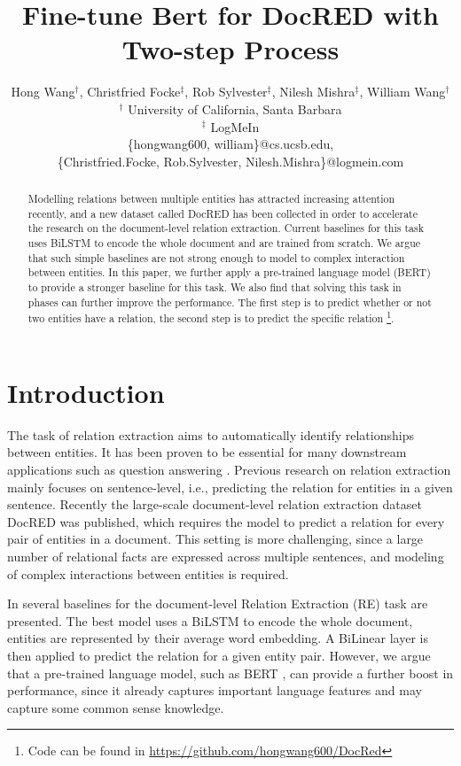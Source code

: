 \documentclass[11pt,a4paper]{article}
\title{Fine-tune Bert for DocRED with Two-step Process}
\author{
 Hong Wang$^\dagger$,
 Christfried Focke$^{\ddag}$, 
 Rob Sylvester$^{\ddag}$, 
 Nilesh Mishra$^\ddag$,
 William Wang$^\dagger$
\\
 $^\dagger$ University of California, Santa Barbara\\
 $^\ddag$ LogMeIn\\
 \{hongwang600, william\}@cs.ucsb.edu,\\
 \{Christfried.Focke, Rob.Sylvester, Nilesh.Mishra\}@logmein.com
 }
\date{}
\begin{document}
\maketitle
\begin{abstract}
  Modelling relations between multiple entities has attracted increasing attention recently, and a new dataset called DocRED has been collected in order to accelerate the research on the document-level relation extraction. Current baselines for this task uses BiLSTM to encode the whole document and are trained from scratch. We argue that such simple baselines are not strong enough to model to complex interaction between entities. In this paper, we further apply a pre-trained language model (BERT) to provide a stronger baseline for this task. We also find that solving this task in phases can further improve the performance. The first step is to predict whether or not two entities have a relation, the second step is to predict the specific relation \footnote{Code can be found in \url{https://github.com/hongwang600/DocRed}}.
\end{abstract}



\section{Introduction}

The task of relation extraction aims to automatically identify relationships between entities. It has been proven to be essential for many downstream applications such as question answering \cite{KBQA_Yih,KBQA_Mo}. Previous research \cite{SocherHMN12,ZengLLZZ14,ZengLC015,SantosXZ15,XiaoL16,BiLSTM_RE,LinSLLS16,WuBR17,WangXQ18a,HanYLSL18,mo_acl19} on relation extraction mainly focuses on sentence-level, i.e., predicting the relation for entities in a given sentence. Recently the large-scale document-level relation extraction dataset DocRED \cite{yao2019DocRED} was published, which requires the model to predict a relation for every pair of entities in a document. This setting is more challenging, since a large number of relational facts are expressed across multiple sentences, and modeling of complex interactions between entities is required.

In \cite{yao2019DocRED} several baselines for the document-level Relation Extraction (RE) task are presented. The best model uses a BiLSTM \cite{BiLSTM} to encode the whole document, entities are represented by their average word embedding. A BiLinear layer is then applied to predict the relation for a given entity pair. However, we argue that a pre-trained language model, such as BERT \cite{BERT}, can provide a further boost in performance, since it already captures important language features and may capture some common sense knowledge.
\end{document}
